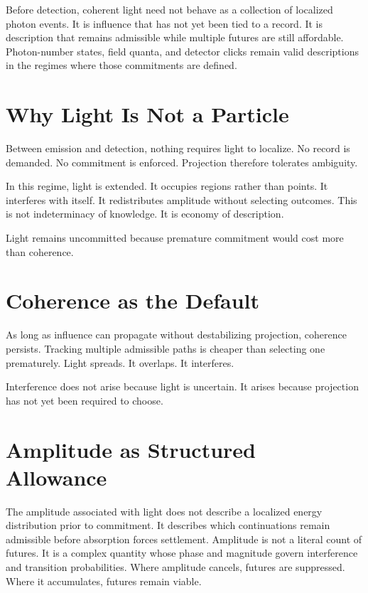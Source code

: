 \documentclass[11pt,twoside,openright]{book}
\begin{document}
Before detection, coherent light need not behave as a collection of localized photon events. It is influence that has not yet been tied to a record. It is description that remains admissible while multiple futures are still affordable. Photon-number states, field quanta, and detector clicks remain valid descriptions in the regimes where those commitments are defined.

\section*{Why Light Is Not a Particle}

Between emission and detection, nothing requires light to localize. No record is demanded. No commitment is enforced. Projection therefore tolerates ambiguity.

In this regime, light is extended. It occupies regions rather than points. It interferes with itself. It redistributes amplitude without selecting outcomes. This is not indeterminacy of knowledge. It is economy of description.

Light remains uncommitted because premature commitment would cost more than coherence.

\section*{Coherence as the Default}

As long as influence can propagate without destabilizing projection, coherence persists. Tracking multiple admissible paths is cheaper than selecting one prematurely. Light spreads. It overlaps. It interferes.

Interference does not arise because light is uncertain. It arises because projection has not yet been required to choose.

\section*{Amplitude as Structured Allowance}

The amplitude associated with light does not describe a localized energy distribution prior to commitment. It describes which continuations remain admissible before absorption forces settlement. Amplitude is not a literal count of futures. It is a complex quantity whose phase and magnitude govern interference and transition probabilities. Where amplitude cancels, futures are suppressed. Where it accumulates, futures remain viable.
\end{document}
